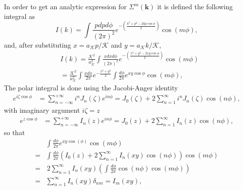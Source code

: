 \documentclass[english,aps,prd,nofootinbib,twocolumn]{revtex4-1}
\begin{document}
In order to get an analytic expression for $\Sigma^{m}(\mathbf{k })$ it is defined the following integral as
\begin{equation}
I(k)=\int \!\! \frac{p dp d\phi }{(2\pi)^2}
e^{-\left( 
\tfrac{k^{2}+p^{2}-2kp \cos \!\phi}{2} 
\right)}
\cos(m\phi),
\end{equation}
and, after substituting $x=a_{\mathcal{K}}p/\mathcal{K}$ and $y=a_{\mathcal{K}}k/\mathcal{K}$,
\begin{equation}
\label{eq:Self-energy-integral}
\begin{split}
&I(k)=\frac{\mathcal{K}^{2}}{a_{\mathcal{K}}^{2}}\!\!
\int \!\! \frac{x dx d\phi }{(2\pi)^2}
e^{-\left( 
\tfrac{x^{2}+y^{2}-2xy \cos \!\phi}{2} 
\right)}
\!\! \cos(m\phi) \\ &=
\frac{\mathcal{K}^{2}}{a_{\mathcal{K}}^{2}}\!\!
\int \!\! \frac{x dx}{2\pi}
e^{-\tfrac{x^{2}+y^{2}}{2} } \!\!
\int \!\! \frac{d\phi }{2\pi}
e^{xy \cos \!\phi} 
\! \cos(m\phi)
,
\end{split}
\end{equation}
The polar integral is done using the Jacobi-Anger identity
\begin{equation*}
\begin{split}
e^{i\zeta\cos\phi} \!&= \!\!\!
\sum_{n=-\infty}^{+\infty} \!\!\!\!
i^{n}J_{n}(\zeta)e^{in\phi}\!
= J_{0}(\zeta)\! + \!
2\sum_{n=1}^{\infty} \!
i^{n}J_{n}(\zeta)\cos(n\phi),
\end{split}
\end{equation*}
with imaginary argument $i\zeta=z$
\begin{equation}
\begin{split}
e^{z\cos\phi} \!&= \!\!\!\! 
\sum_{n=-\infty}^{+\infty} \!\!\!\!
I_{n}(z)e^{in\phi}\!
= J_{0}(z)\! + \!
2 \! \sum_{n=1}^{\infty} \!
I_{n}(z)\cos(n\phi),
\end{split}
\end{equation}
so that 
\begin{equation}
\begin{split}
&
\int \!\! \frac{d\phi }{2\pi}
e^{xy \cos(\phi)} 
\! \cos(m\phi)
\\=&
\int \!\! \frac{d\phi }{2\pi}
\left(
I_{0}(z) + 
2\sum_{n=1}^{\infty}I_{n}(xy)\cos(n\phi)
\right)
\! \cos(m\phi)
\\=& \,
2\sum_{n=1}^{\infty}I_{n}(xy)
\left(
\int \!\! \frac{d\phi }{2\pi}
\cos(n\phi)\! \cos(m\phi)
\right)
\\=&
\sum_{n=1}^{\infty}I_{n}(xy) \delta_{nm}
= I_{m}(xy)
,
\end{split}
\end{equation}
\end{document}

